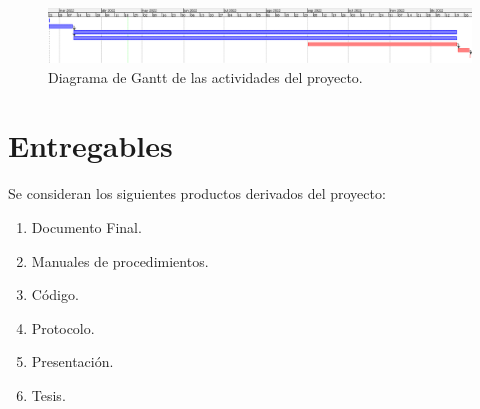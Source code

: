     \begin{figure}[H]
        \centering
        \includegraphics[width=\textwidth]{Propuesta_Plantilla_Tesis_LaTeX_UAG/imagenes/gantt.png}
        \caption{Diagrama de Gantt de las actividades del proyecto.}
        \label{fig:gantt}
    \end{figure}


\section{Entregables}

    Se consideran los siguientes productos derivados del proyecto:
    
    \begin{enumerate}
        \item Documento Final.
        \item Manuales de procedimientos.
        \item Código.
        \item Protocolo.
        \item Presentación.
        \item Tesis.
    \end{enumerate}